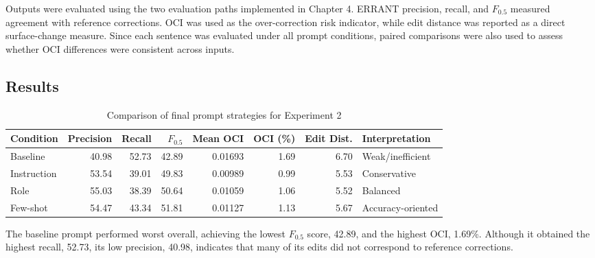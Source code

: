 Outputs were evaluated using the two evaluation paths implemented in Chapter 4. ERRANT precision, recall, and $F_{0.5}$ measured agreement with reference corrections. OCI was used as the over-correction risk indicator, while edit distance was reported as a direct surface-change measure. Since each sentence was evaluated under all prompt conditions, paired comparisons were also used to assess whether OCI differences were consistent across inputs.

\subsection{Results}

\begin{table}[htbp]
    \centering
    \caption{Comparison of final prompt strategies for Experiment 2}
    \label{tab:exp2_strategy_comparison}
    \renewcommand{\arraystretch}{1.15}
    \begin{adjustbox}{max width=\textwidth}
    \begin{tabular}{lrrrrrrl}
        \toprule
        \textbf{Condition} 
        & \textbf{Precision} 
        & \textbf{Recall} 
        & \textbf{$F_{0.5}$} 
        & \textbf{Mean OCI} 
        & \textbf{OCI (\%)} 
        & \textbf{Edit Dist.} 
        & \textbf{Interpretation} \\
        \midrule
        Baseline    
        & 40.98 & 52.73 & 42.89 & 0.01693 & 1.69 & 6.70 
        & Weak/inefficient \\

        Instruction 
        & 53.54 & 39.01 & 49.83 & 0.00989 & 0.99 & 5.53 
        & Conservative \\

        Role        
        & 55.03 & 38.39 & 50.64 & 0.01059 & 1.06 & 5.52 
        & Balanced \\

        Few-shot    
        & 54.47 & 43.34 & 51.81 & 0.01127 & 1.13 & 5.67 
        & Accuracy-oriented \\
        \bottomrule
    \end{tabular}
    \end{adjustbox}
\end{table}

The baseline prompt performed worst overall, achieving the lowest $F_{0.5}$ score, 42.89, and the highest OCI, 1.69\%. Although it obtained the highest recall, 52.73, its low precision, 40.98, indicates that many of its edits did not correspond to reference corrections.

